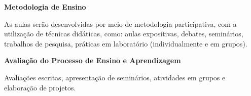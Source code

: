 


 

\begin{snugshade}\begin{center}\textbf{
    Metodologia de Ensino
}\end{center}\end{snugshade}

\noindent
   As aulas serão desenvolvidas por meio de metodologia participativa, com a utilização de técnicas didáticas, como: aulas expositivas, debates, seminários, trabalhos de pesquisa, práticas em laboratório (individualmente e em grupos).

\begin{snugshade}\begin{center}\textbf{
    Avaliação do Processo de Ensino e Aprendizagem
}\end{center}\end{snugshade}

\noindent
  Avaliações escritas, apresentação de seminários, atividades em grupos e elaboração de projetos.
   
